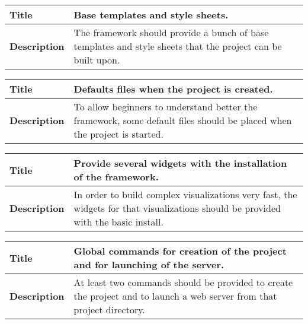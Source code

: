 \documentclass[12pt]{article}
\begin{document}
                \begin{tabularx}{\textwidth}{|l|X|}
                    \hline
                    \textbf{Title} & Base templates and style sheets. \\
                    \hline
                    \textbf{Description} & The framework should provide a bunch
                    of base templates and style sheets that the project can be
                    built upon. \\
                    \hline
                \end{tabularx}

                \begin{tabularx}{\textwidth}{|l|X|}
                    \hline
                    \textbf{Title} & Defaults files when the project is created. \\
                    \hline
                    \textbf{Description} & To allow beginners to understand
                    better the framework, some default files should be placed
                    when the project is started. \\
                    \hline
                \end{tabularx}

                \begin{tabularx}{\textwidth}{|l|X|}
                    \hline
                    \textbf{Title} & Provide several widgets with the
                    installation of the framework. \\
                    \hline
                    \textbf{Description} & In order to build complex
                    visualizations very fast, the widgets for that
                    visualizations should be provided with the basic install. \\
                    \hline
                \end{tabularx}

                \begin{tabularx}{\textwidth}{|l|X|}
                    \hline
                    \textbf{Title} & Global commands for creation of the project
                    and for launching of the server. \\
                    \hline
                    \textbf{Description} & At least two commands should be
                    provided to create the project and to launch a web server
                    from that project directory. \\
                    \hline
                \end{tabularx}
            \setlength{\parindent}{1cm}
\end{document}
